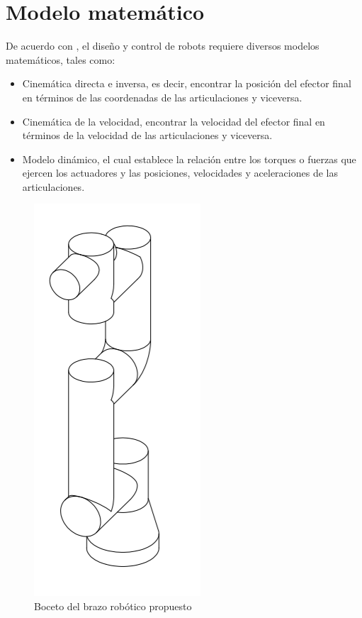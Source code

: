 \chapter{Modelo matemático}

De acuerdo con \cite[p.~14]{Dombre2007}, el diseño y control de robots requiere diversos modelos matemáticos, tales como:

\begin{itemize}
\item Cinemática directa e inversa, es decir, encontrar la posición del efector final en términos de las coordenadas de las articulaciones y viceversa.
\item Cinemática de la velocidad, encontrar la velocidad del efector final en términos de la velocidad de las articulaciones y viceversa.
\item Modelo dinámico, el cual establece la relación entre los torques o fuerzas que ejercen los actuadores y las posiciones, velocidades y aceleraciones de las articulaciones.
\end{itemize}

\begin{figure}
    \centering
    \includegraphics[scale=0.7]{./img/chapter4/robotarmprototype.png}
    \caption{Boceto del brazo robótico propuesto}
    \label{fig:roboticarmprototype}
\end{figure}

